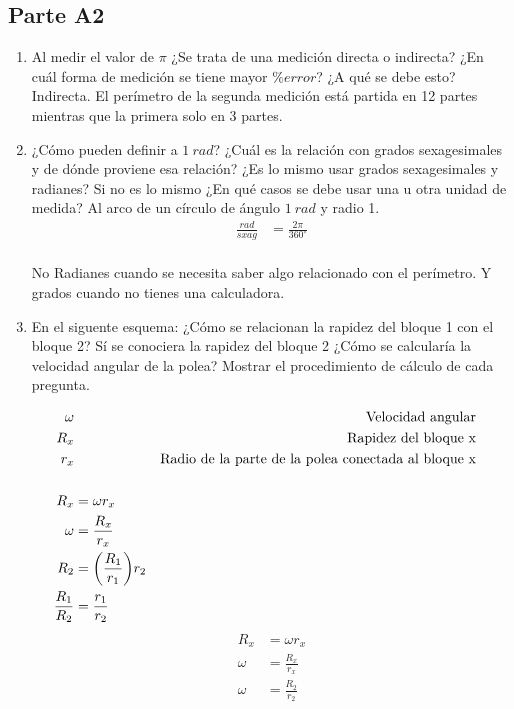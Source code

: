 \subsection{Parte A2}%
\label{sub:cues_parte_a2}

\begin{enumerate}
	\item Al medir el valor de $\pi$
		¿Se trata de una medición directa o indirecta?
		¿En cuál forma de medición se tiene mayor $\% error$?
		¿A qué se debe esto?
		\subitem Indirecta.
		\subitem El perímetro de la segunda medición está partida en 12 partes
		mientras que la primera solo en 3 partes.
	\item ¿Cómo pueden definir a $1\ rad$?
		¿Cuál es la relación con grados sexagesimales y de dónde proviene esa relación?
		¿Es lo mismo usar grados sexagesimales y radianes?
		Si no es lo mismo
		¿En qué casos se debe usar una u otra unidad de medida?
		\subitem Al arco de un círculo de ángulo $1\ rad$ y radio 1.
		\subitem
		\begin{align*}
			\frac{rad}{sxag} &= \frac{2\pi}{360^\circ} \\
		\end{align*}
		\begin{figure}[H]
			\centering
			
		\end{figure}
		\subitem No
		\subitem Radianes cuando se necesita saber algo relacionado con el perímetro.
		\subitem Y grados cuando no tienes una calculadora.
	\item En el siguente esquema:
		¿Cómo se relacionan la rapidez del bloque 1 con el bloque 2?
		Sí se conociera la rapidez del bloque 2
		¿Cómo se calcularía la velocidad angular de la polea?
		Mostrar el procedimiento de cálculo de cada pregunta.
		\begin{figure}[H]
			\centering
			
		\end{figure}
		\subitem
			\begin{align*}
				\omega && \text{Velocidad angular}\\
				R_x && \text{Rapidez del bloque x}\\
				r_x && \text{Radio de la parte de la polea conectada al bloque x}\\
				\\
				R_x &= \omega r_x\\
				\omega &= \frac{R_x}{r_x} \\
				R_2 &= \bigg{(} \frac{R_1}{r_1} \bigg{)}r_2
				\\
				\frac{R_1}{R_2} &= \frac{r_1}{r_2} && \\
			\end{align*}
		\subitem
			\begin{align*}
				R_x &= \omega r_x\\
				\omega &= \frac{R_x}{r_x} \\
				\omega &= \frac{R_2}{r_2} \\
			\end{align*}
\end{enumerate}
